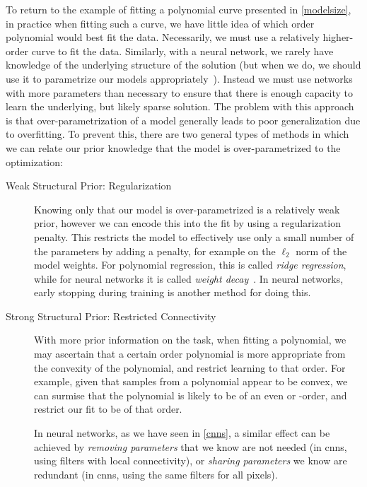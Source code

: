 \documentclass[thesis]{subfiles}
\begin{document}
	To return to the example of fitting a polynomial curve presented in \cref{modelsize}, in practice when fitting such a curve, we have little idea of which order polynomial would best fit the data. Necessarily, we must use a relatively higher-order curve to fit the data. Similarly, with a neural network, we rarely have knowledge of the underlying structure of the solution (but when we do, we should use it to parametrize our models appropriately~\citep{jain2016structural}). Instead we must use networks with more parameters than necessary to ensure that there is enough capacity to learn the underlying, but likely sparse solution. The problem with this approach is that over-parametrization of a model generally leads to poor generalization due to overfitting. To prevent this, there are two general types of methods in which we can relate our prior knowledge that the model is over-parametrized to the optimization:
	\begin{description}
	\item[Weak Structural Prior: Regularization]
	Knowing only that our model is over-parametrized is a relatively weak prior, however we can encode this into the fit by using a regularization penalty. This restricts the model to effectively use only a small number of the parameters by adding a penalty, for example on the $\ell_2$ norm of the model weights. For polynomial regression, this is called \emph{ridge regression}, while for neural networks it is called \emph{weight decay}~\citep{hinton1987learning}. In neural networks, early stopping during training is another method for doing this.
	
	\item[Strong Structural Prior: Restricted Connectivity]
	With more prior information on the task, \ie when fitting a polynomial, we may ascertain that a certain order polynomial is more appropriate from the convexity of the polynomial, and restrict learning to that order. For example, given that samples from a polynomial appear to be convex, we can surmise that the polynomial is likely to be of an even or -order, and restrict our fit to be of that order. 

	In neural networks, as we have seen in \cref{cnns}, a similar effect can be achieved by \emph{removing parameters} that we know are not needed (\ie  in \glspl{cnn}, using filters with local connectivity), or \emph{sharing parameters} we know are redundant (\ie in \glspl{cnn}, using the same filters for all pixels).
    \end{description}
    
\end{document}
